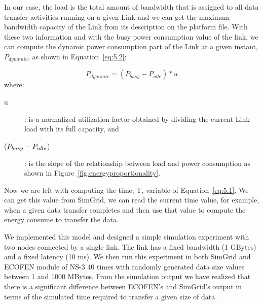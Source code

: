 In our case, the load is the total amount of bandwidth that is assigned to all data transfer activities running on a given Link and we can get the maximum bandwidth capacity of the Link from its description on the platform file. With these two information and with the busy power consumption value of the link, we can compute the dynamic power consumption part of the Link at a given instant, \(P_{dynamic}\), as shown in Equation~\ref{eq:5.2}:

\begin{equation} \label{eq:5.2}
P_{dynamic} = (P_{busy} - P_{idle}) * u 
\end{equation} 
where:
\begin{description}
    \item [u]: is a normalized utilization factor obtained by dividing the current Link load with its full capacity, and 
    \item [(\($$P_{busy} - P_{idle}$$\))]: is the slope of the relationship between load and power consumption as shown in Figure~\ref{fig:energyproportionality}.
\end{description} 

Now we are left with computing the time, T, variable of Equation~\ref{eq:5.1}. We can get this value from SimGrid, we can read the current time value, for example, when a given data transfer completes and then use that value to compute the energy consume to transfer the data.

We implemented this model and designed a simple simulation experiment with two nodes connected by a single link. The link has a fixed bandwidth (1 GBytes) and a fixed latency (10 ms). We then run this experiment in both SimGrid and ECOFEN module of NS-3 40 times with randomly generated data size values between 1 and 1000 MBytes. From the simulation output we have realized that there is a significant difference between ECOFEN's and SimGrid's output in terms of the simulated time required to transfer a given size of data. 

